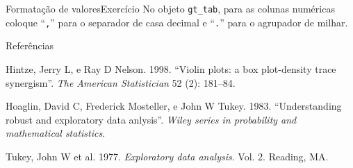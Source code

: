 \documentclass[
  10pt,
  ignorenonframetext,
]{beamer}
\newlength{\cslhangindent}
\newlength{\cslentryspacingunit} %
\newenvironment{CSLReferences}[2] %
 {%
  \setlength{\parindent}{0pt}
  \ifodd #1
  \let\oldpar\par
  \def\par{\hangindent=\cslhangindent\oldpar}
  \fi
  \setlength{\parskip}{#2\cslentryspacingunit}
 }%
 {}
\begin{document}
\begin{frame}[fragile]{Formatação de valores\newline Exercício}
\protect\hypertarget{formatauxe7uxe3o-de-valoresexercuxedcio}{}
No objeto \texttt{gt\_tab}, para as colunas numéricas coloque
``\texttt{,}'' para o separador de casa decimal e ``\texttt{.}'' para o
agrupador de milhar.
\end{frame}

\begin{frame}{Referências}
\protect\hypertarget{referuxeancias}{}
\hypertarget{refs}{}
\begin{CSLReferences}{1}{0}
\leavevmode{}%
Hintze, Jerry L, e Ray D Nelson. 1998. {``Violin plots: a box
plot-density trace synergism''}. \emph{The American Statistician} 52
(2): 181--84.

\leavevmode{}%
Hoaglin, David C, Frederick Mosteller, e John W Tukey. 1983.
{``Understanding robust and exploratory data anlysis''}. \emph{Wiley
series in probability and mathematical statistics}.

\leavevmode{}%
Tukey, John W et al. 1977. \emph{Exploratory data analysis}. Vol. 2.
Reading, MA.

\end{CSLReferences}
\end{frame}
\end{document}
